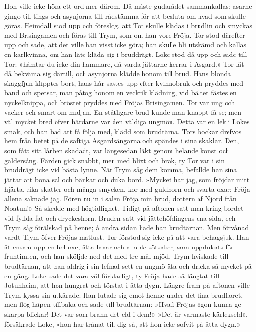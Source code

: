 Hon ville icke höra ett ord mer därom. Då måste gudarådet sammankallas:
asarne gingo till tings och asynjorna till rådstämma för att besluta om
hvad som skulle göras. Heimdall stod upp och föreslog, att Tor skulle
klädas i brudlin och smyckas med Brisingamen och föras till Trym, som om
han vore Fröja. Tor stod därefter upp och sade, att det ville han visst
icke göra; han skulle bli utskämd och kallas en karlkvinna, om han läte
kläda sig i bruddrägt. Loke stod då upp och sade till Tor: »hämtar du
icke din hammare, då varda jättarne herrar i Asgard.» Tor lät då bekväma
sig därtill, och asynjorna klädde honom till brud. Hans blonda skäggfjun
klipptes bort, hans hår sattes upp efter kvinnobruk och pryddes med band
och spetsar, man påtog honom en veckrik klädning, vid bältet fästes en
nyckelknippa, och bröstet pryddes med Fröjas
Brisingamen\protect\hypertarget{lb1625905.xhtmlux5cux23start58}{}{}\protect\hypertarget{lb1625905.xhtmlux5cux23start58-a}{}{}\protect\hypertarget{lb1625905.xhtmlux5cux23start58-b}{}{}\protect\hypertarget{lb1625905.xhtmlux5cux23start58-c}{}{}\protect\hypertarget{lb1625905.xhtmlux5cux23start58-d}{}{}.
Tor var ung och vacker och smärt om midjan. En ståtligare brud kunde man
knappt få se; men väl mycket bred öfver härdarne var den väldiga ungmön.
Detta var en lek i Lokes smak, och han bad att få följa med, klädd som
brudtärna. Tors bockar drefvos hem från betet på de saftiga
Asgardsängarna och spändes i sina skaklar. Den, som fått sitt lårben
skadadt, var längesedan läkt genom helande konst och galdersång. Färden
gick snabbt, men med blixt och brak, ty Tor var i sin bruddrägt icke vid
bästa lynne. När Trym såg dem komma, befallde han sina jättar att bona
sal och bänkar och duka bord. »Mycket har jag, som fröjdar mitt hjärta,
rika skatter och många smycken, kor med guldhorn och svarta oxar; Fröja
allena saknade jag. Fören nu in i salen Fröja min brud, dottern af Njord
från Noatun!» Så skedde med högtidlighet. Tidigt på aftonen satt man
kring bordet vid fyllda fat och dryckeshorn. Bruden satt vid
jättehöfdingens ena sida, och Trym såg förälskad på henne; å andra sidan
hade han brudtärnan. Men förvånad vardt Trym öfver Fröjas matlust. Tor
förstod sig icke på att vara behagsjuk. Han åt ensam upp en hel oxe,
åtta laxar och alla de sötsaker, som uppdukats för fruntimren, och han
sköljde ned det med tre mål mjöd. Trym hviskade till brudtärnan, att han
aldrig i sin lefnad sett en ungmö äta och dricka så mycket på en gång.
Loke sade det vara väl förklarligt, ty Fröja hade så längtat till
Jotunheim, att hon hungrat och törstat i åtta dygn. Längre fram på
aftonen ville Trym kyssa sin utkårade. Han lutade sig emot henne under
det fina brudfloret, men flög häpen tillbaka och sade till brudtärnan:
»Hvad Fröjas ögon kunna ge skarpa blickar! Det var som brann det eld i
dem!» »Det är varmaste kärlekseld», försäkrade Loke, »hon har trånat
till dig så, att hon icke sofvit på åtta dygn.»

